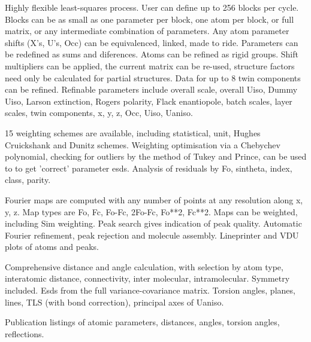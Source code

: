 \documentclass[10pt,a4paper]{report}
\begin{document}
Highly flexible least-squares process. User can define up to 256 blocks per cycle. Blocks can be as small as one parameter per block, one atom per block, or full matrix, or any intermediate combination of parameters. Any atom parameter shifts (X's, U's, Occ) can be equivalenced, linked,  made to ride. Parameters can be redefined as sums and diferences. Atoms can be refined as rigid groups. Shift multipliers can be applied, the current matrix can be re-used, structure factors need only be calculated for partial structures. Data for up to 8 twin components can be refined. Refinable parameters include overall scale, overall Uiso, Dummy Uiso, Larson extinction, Rogers polarity, Flack enantiopole, batch scales, layer scales, twin components, x, y, z, Occ, Uiso, Uaniso.



15 weighting schemes are available, including statistical, unit, Hughes Cruickshank and Dunitz schemes. Weighting optimisation via a Chebychev polynomial, checking for outliers by the method of Tukey and Prince, can be used to to get 'correct' parameter esds. Analysis of residuals by Fo, sintheta, index, class, parity.



Fourier maps are computed with any number of points at any resolution along x, y, z. Map types are Fo, Fc, Fo-Fc, 2Fo-Fc, Fo**2, Fc**2. Maps can be weighted, including Sim weighting. Peak search gives indication  of peak quality. Automatic Fourier refinement, peak rejection  and  molecule assembly.  Lineprinter and VDU plots of atoms and peaks.



Comprehensive distance and angle calculation, with selection by atom  type, interatomic distance, connectivity, inter molecular, intramolecular. Symmetry included. Esds from the full variance-covariance matrix. Torsion angles, planes, lines, TLS (with bond correction), principal axes of  Uaniso.



Publication listings of atomic parameters, distances, angles, torsion angles, reflections.



\bigskip{}
\end{document}
